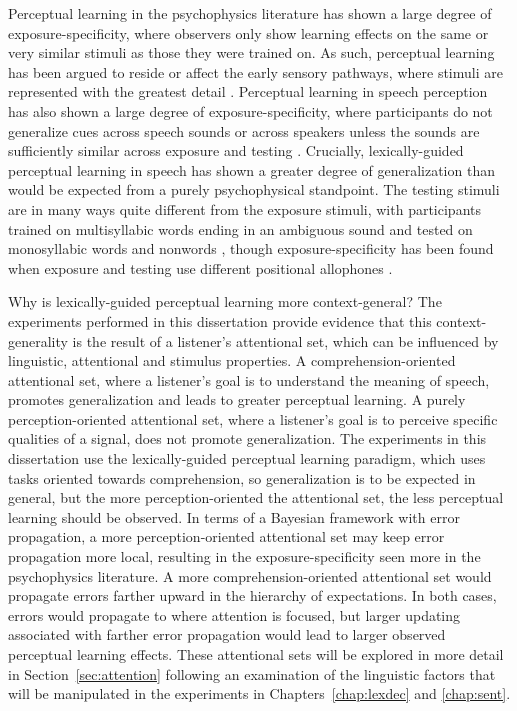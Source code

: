 Perceptual learning in the psychophysics literature has shown a large degree of exposure-specificity, where observers only show learning effects on the same or very similar stimuli as those they were trained on. 
As such, perceptual learning has been argued to reside or affect the early sensory pathways, where stimuli are represented with the greatest detail \citep{Gilbert2001}.  
Perceptual learning in speech perception has also shown a large degree of exposure-specificity, where participants do not generalize cues across speech sounds \citep{Reinisch2014} or across speakers unless the sounds are sufficiently similar across exposure and testing \citep{Eisner2005, Kraljic2005, Kraljic2007, Reinisch2013a}.  
Crucially, lexically-guided perceptual learning in speech has shown a greater degree of generalization than would be expected from a purely psychophysical standpoint.  
The testing stimuli are in many ways quite different from the exposure stimuli, with participants trained on multisyllabic words ending in an ambiguous sound and tested on monosyllabic words \citep{Reinisch2013} and nonwords \citep{Norris2003, Kraljic2005}, though exposure-specificity has been found when exposure and testing use different positional allophones \citep{Mitterer2013}.

Why is lexically-guided perceptual learning more context-general?
The experiments performed in this dissertation provide evidence that this context-generality is the result of a listener's attentional set, which can be influenced by linguistic, attentional and stimulus properties.
A comprehension-oriented attentional set, where a listener's goal is to understand the meaning of speech, promotes generalization and leads to greater perceptual learning.  
A purely perception-oriented attentional set, where a listener's goal is to perceive specific qualities of a signal, does not promote generalization.
The experiments in this dissertation use the lexically-guided perceptual learning paradigm, which uses tasks oriented towards comprehension, so generalization is to be expected in general, but the more perception-oriented the attentional set, the less perceptual learning should be observed.
In terms of a Bayesian framework with error propagation, a more perception-oriented attentional set may keep error propagation more local, resulting in the exposure-specificity seen more in the psychophysics literature.
A more comprehension-oriented attentional set would propagate errors farther upward in the hierarchy of expectations.
In both cases, errors would propagate to where attention is focused, but larger updating associated with farther error propagation would lead to larger observed perceptual learning effects.
These attentional sets will be explored in more detail in Section~\ref{sec:attention} following an examination of the linguistic factors that will be manipulated in the experiments in Chapters~\ref{chap:lexdec} and \ref{chap:sent}.

